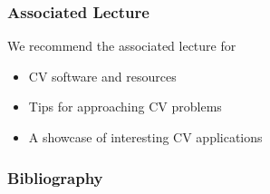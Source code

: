 \documentclass[xetex,professionalfont]{beamer}
\begin{document}

\begin{frame}
\frametitle{Associated Lecture}

We recommend the associated lecture for
\begin{itemize}
	\item CV software and resources
	\item Tips for approaching CV problems
	\item A showcase of interesting CV applications
\end{itemize}

\end{frame}


\begin{frame}
\frametitle{Bibliography}

\printbibliography

\end{frame}
\end{document}
